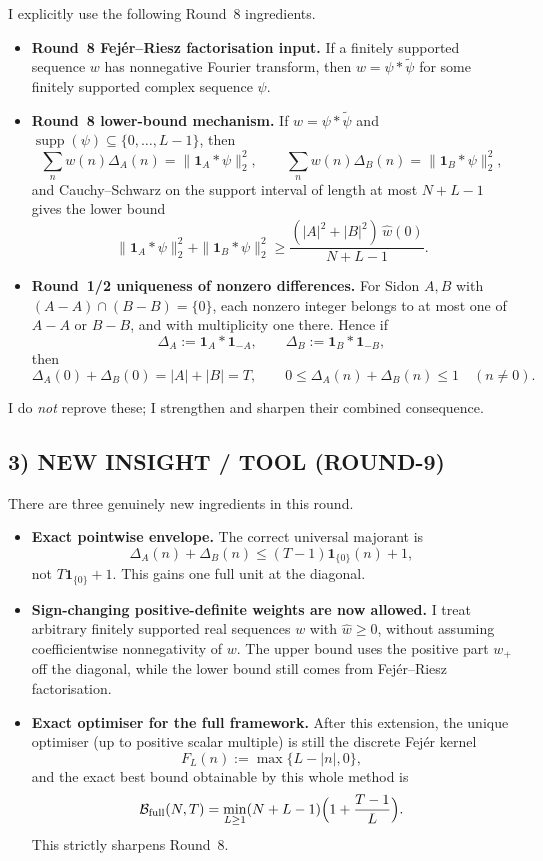 I explicitly use the following Round~8 ingredients.
\begin{itemize}
\item \textbf{Round~8 Fej\'er--Riesz factorisation input.}  If a finitely supported sequence \(w\) has nonnegative Fourier transform, then \(w=\psi*\widetilde\psi\) for some finitely supported complex sequence \(\psi\).
\item \textbf{Round~8 lower-bound mechanism.}  If \(w=\psi*\widetilde\psi\) and \(\operatorname{supp}(\psi)\subseteq\{0,\dots,L-1\}\), then
\[
\sum_n w(n)\Delta_A(n)=\|\mathbf 1_A*\psi\|_2^2,
\qquad
\sum_n w(n)\Delta_B(n)=\|\mathbf 1_B*\psi\|_2^2,
\]
and Cauchy--Schwarz on the support interval of length at most \(N+L-1\) gives the lower bound
\[
\|\mathbf 1_A*\psi\|_2^2+\|\mathbf 1_B*\psi\|_2^2
\ge \frac{(|A|^2+|B|^2)\,\widehat w(0)}{N+L-1}.
\]
\item \textbf{Round~1/2 uniqueness of nonzero differences.}  For Sidon \(A,B\) with \((A-A)\cap(B-B)=\{0\}\), each nonzero integer belongs to at most one of \(A-A\) or \(B-B\), and with multiplicity one there.  Hence if
\[
\Delta_A:=\mathbf 1_A*\mathbf 1_{-A},\qquad \Delta_B:=\mathbf 1_B*\mathbf 1_{-B},
\]
then
\[
\Delta_A(0)+\Delta_B(0)=|A|+|B|=T,
\qquad
0\le \Delta_A(n)+\Delta_B(n)\le 1\quad (n\ne 0).
\]
\end{itemize}

I do \emph{not} reprove these; I strengthen and sharpen their combined consequence.

\subsection{3) NEW INSIGHT / TOOL (ROUND-9)}

There are three genuinely new ingredients in this round.
\begin{itemize}
\item \textbf{Exact pointwise envelope.}  The correct universal majorant is
\[
\Delta_A(n)+\Delta_B(n)
\le (T-1)\mathbf 1_{\{0\}}(n)+1,
\]
not \(T\mathbf 1_{\{0\}}+1\).  This gains one full unit at the diagonal.

\item \textbf{Sign-changing positive-definite weights are now allowed.}  I treat arbitrary finitely supported real sequences \(w\) with \(\widehat w\ge 0\), without assuming coefficientwise nonnegativity of \(w\).  The upper bound uses the positive part \(w_+\) off the diagonal, while the lower bound still comes from Fej\'er--Riesz factorisation.

\item \textbf{Exact optimiser for the full framework.}  After this extension, the unique optimiser (up to positive scalar multiple) is still the discrete Fej\'er kernel
\[
F_L(n):=\max\{L-|n|,0\},
\]
and the exact best bound obtainable by this whole method is
\[
\mathcal B_{\mathrm{full}}(N,T)
=
\min_{L\ge 1}(N+L-1)\Bigl(1+\frac{T-1}{L}\Bigr).
\]
This strictly sharpens Round~8.
\end{itemize}

